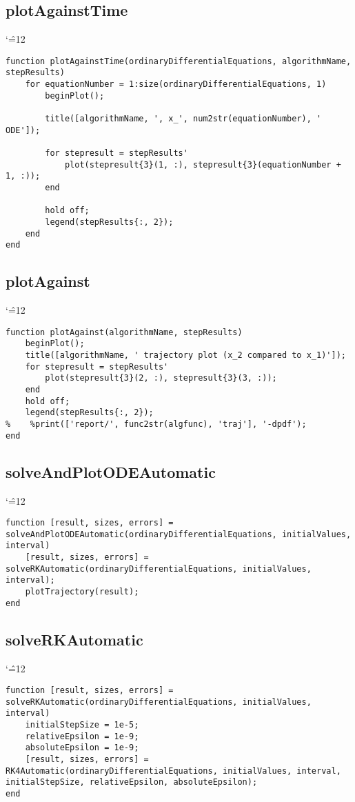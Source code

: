 \documentclass[12pt]{report}
\newenvironment{simplechar}{%
   \catcode`\^=12
}{}
\begin{document}
\subsection{plotAgainstTime}
\begin{simplechar}
\begin{lstlisting}
function plotAgainstTime(ordinaryDifferentialEquations, algorithmName, stepResults)
    for equationNumber = 1:size(ordinaryDifferentialEquations, 1)
        beginPlot();

        title([algorithmName, ', x_', num2str(equationNumber), ' ODE']);

        for stepresult = stepResults'
            plot(stepresult{3}(1, :), stepresult{3}(equationNumber + 1, :));
        end

        hold off;
        legend(stepResults{:, 2});
    end
end
\end{lstlisting}
\end{simplechar}

\subsection{plotAgainst}
\begin{simplechar}
\begin{lstlisting}
function plotAgainst(algorithmName, stepResults)
    beginPlot();
    title([algorithmName, ' trajectory plot (x_2 compared to x_1)']);
    for stepresult = stepResults'
        plot(stepresult{3}(2, :), stepresult{3}(3, :));
    end
    hold off;
    legend(stepResults{:, 2});
%    %print(['report/', func2str(algfunc), 'traj'], '-dpdf');
end
\end{lstlisting}
\end{simplechar}

\subsection{solveAndPlotODEAutomatic}
\begin{simplechar}
\begin{lstlisting}
function [result, sizes, errors] = solveAndPlotODEAutomatic(ordinaryDifferentialEquations, initialValues, interval)
    [result, sizes, errors] = solveRKAutomatic(ordinaryDifferentialEquations, initialValues, interval);
    plotTrajectory(result);
end
\end{lstlisting}
\end{simplechar}

\subsection{solveRKAutomatic}
\begin{simplechar}
\begin{lstlisting}
function [result, sizes, errors] = solveRKAutomatic(ordinaryDifferentialEquations, initialValues, interval)
    initialStepSize = 1e-5;
    relativeEpsilon = 1e-9;
    absoluteEpsilon = 1e-9;
    [result, sizes, errors] = RK4Automatic(ordinaryDifferentialEquations, initialValues, interval, initialStepSize, relativeEpsilon, absoluteEpsilon);
end
\end{lstlisting}
\end{simplechar}
\end{document}
